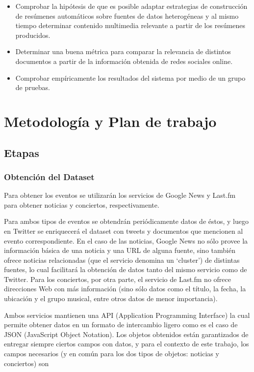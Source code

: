 \documentclass[11pt,letterpaper]{article}
\begin{document}
\begin{itemize}
\item Comprobar la hipótesis de que es posible adaptar estrategias de
     construcción de resúmenes automáticos sobre fuentes de datos
     heterogéneas y al mismo tiempo determinar contenido multimedia
     relevante a partir de los resúmenes producidos.
\item Determinar una buena métrica para comparar la relevancia de
     distintos documentos a partir de la información obtenida de redes
     sociales online.
\item Comprobar empíricamente los resultados del sistema por medio de
     un grupo de pruebas.
\end{itemize}
\pagebreak
\section{Metodología y Plan de trabajo}
\label{sec-5}

  
\subsection{Etapas}
\label{sec-5.1}

\subsubsection{Obtención del Dataset}
\label{sec-5.1.1}

    Para obtener los eventos se utilizarán los servicios de Google
    News y Last.fm para obtener noticias y conciertos,
    respectivamente.

    Para ambos tipos de eventos se obtendrán periódicamente datos de
    éstos, y luego en Twitter se enriquecerá el dataset con tweets y
    documentos que mencionen al evento correspondiente. En el caso de
    las noticias, Google News no sólo provee la información básica de
    una noticia y una URL de alguna fuente, sino también ofrece
    noticias relacionadas (que el servicio denomina un `cluster') de
    distintas fuentes, lo cual facilitará la obtención de datos tanto
    del mismo servicio como de Twitter. Para los conciertos, por otra parte,
    el servicio de Last.fm no ofrece direcciones Web con más
    información (sino sólo datos como el título, la fecha, la ubicación y el
    grupo musical, entre otros datos de menor importancia).

    Ambos servicios mantienen una API (Application Programming
    Interface) la cual permite obtener datos en un formato de
    intercambio ligero como es el caso de JSON (JavaScript
    Object Notation). Los objetos obtenidos están garantizados de
    entregar siempre ciertos campos con datos, y para el contexto de
    este trabajo, los campos necesarios (y en común para los dos tipos
    de objetos: noticias y conciertos) son
\end{document}
